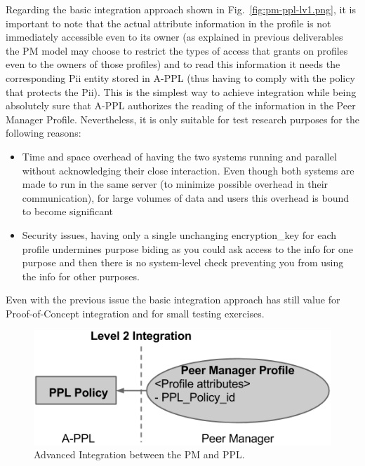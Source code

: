 Regarding the basic integration approach shown in Fig.~\ref{fig:pm-ppl-lv1.png}, it is important to note that the actual attribute information in the profile is not immediately accessible even to its owner (as explained in previous deliverables the PM model may choose to restrict the types of access that grants on profiles even to the owners of those profiles) and to read this information it needs the corresponding Pii entity stored in A-PPL (thus having to comply with the policy that protects the Pii). This is the simplest way to achieve integration while being absolutely sure that A-PPL authorizes the reading of the information in the Peer Manager Profile. Nevertheless, it is only suitable for test research purposes for the following reasons:
\begin{itemize}
	\item Time and space overhead of having the two systems running and parallel without acknowledging their close interaction. Even though both systems are made to run in the same server (to minimize possible overhead in their communication), for large volumes of data and users this overhead is bound to become significant
	\item Security issues, having only a single unchanging encryption\_key for each profile undermines purpose biding as you could ask access to the info for one purpose and then there is no system-level check preventing you from using the info for other purposes.
\end{itemize}

Even with the previous issue the basic integration approach has still value for Proof-of-Concept integration and for small testing exercises. 

\begin{figure}[htb!]
\centering
\includegraphics[width=0.6\linewidth]{figures/pm-ppl-lv2.png}
\caption{Advanced Integration between the PM and PPL.}
\label{fig:pm-ppl-lv2.png}
\end{figure}

